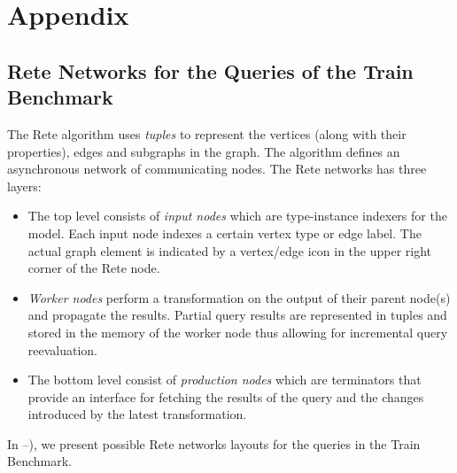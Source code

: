 \appendix
\chapter{Appendix}
\label{appendix}

\section{Rete Networks for the Queries of the Train Benchmark}

The Rete algorithm uses \emph{tuples} to represent the vertices (along with their properties), edges and subgraphs in the graph. The algorithm defines an asynchronous network of communicating nodes. The Rete networks has three layers:

\begin{itemize}
  \item The top level consists of \emph{input nodes} which are type-instance indexers for the model. Each input node indexes a certain vertex type or edge label. The actual graph element is indicated by a vertex/edge icon in the upper right corner of the Rete node.
  \item \emph{Worker nodes} perform a transformation on the output of their parent node(s) and propagate the results. Partial query results are represented in tuples and stored in the memory of the worker node thus allowing for incremental query reevaluation.
  \item The bottom level consist of \emph{production nodes} which are terminators that provide an interface for fetching the results of the query and the changes introduced by the latest transformation.
\end{itemize}

In --), we present possible Rete networks layouts for the queries in the Train Benchmark.

